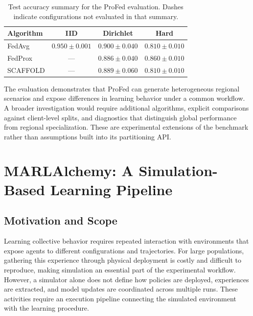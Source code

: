 \begin{table}[t]
  \centering
  \caption{Test accuracy summary for the ProFed evaluation.
   Dashes indicate configurations not evaluated in that summary.}
  \label{tab:test}
  \begin{tabular}{lccc}
    \toprule
    \textbf{Algorithm} & \textbf{IID} & \textbf{Dirichlet} & \textbf{Hard} \\
    \midrule
    FedAvg   & $0.950\pm0.001$ & $0.900\pm0.040$ & $0.810\pm0.010$ \\
    FedProx  & ---             & $0.886\pm0.040$ & $0.860\pm0.010$ \\
    SCAFFOLD & ---             & $0.889\pm0.060$ & $0.810\pm0.010$ \\
    \bottomrule
  \end{tabular}
\end{table}

The evaluation demonstrates that ProFed can generate heterogeneous regional
 scenarios and expose differences in learning behavior under a common workflow.
%
A broader investigation would require additional algorithms, explicit
 comparisons against client-level splits, and diagnostics that distinguish
 global performance from regional specialization.
%
These are experimental extensions of the benchmark rather than assumptions
 built into its partitioning API.

\section{MARLAlchemy: A Simulation-Based Learning Pipeline}
\label{sec:marlalchemy}

\subsection{Motivation and Scope}

Learning collective behavior requires repeated interaction with environments
 that expose agents to different configurations and trajectories.
%
For large populations, gathering this experience through physical deployment
 is costly and difficult to reproduce, making simulation an essential part
 of the experimental workflow.
%
However, a simulator alone does not define how policies are deployed,
 experiences are extracted, and model updates are coordinated across
 multiple runs.
%
These activities require an execution pipeline connecting the simulated
 environment with the learning procedure.

